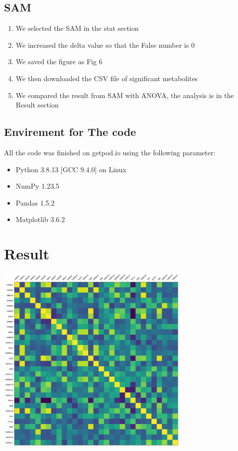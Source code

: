 \documentclass{article}
\begin{document}
\subsection*{SAM}
\begin{enumerate}
    \item We selected the SAM in the stat section
    \item We increased the delta value so that the False number is 0
    \item We saved the figure as Fig 6
    \item We then downloaded the CSV file of significant metabolites
    \item We compared the result from SAM with ANOVA, the analysis is in the Result section
\end{enumerate}

\subsection*{Envirement for The code} 
All the code was finished on getpod.io using the following parameter:
\begin{itemize}
    \item Python 3.8.13 [GCC 9.4.0] on Linux
    \item NumPy 1.23.5
    \item Pandas 1.5.2
    \item Matplotlib 3.6.2
\end{itemize}

\section{Result}

\centering
\includegraphics[width=0.7\textwidth]{output.png}
\end{document}
